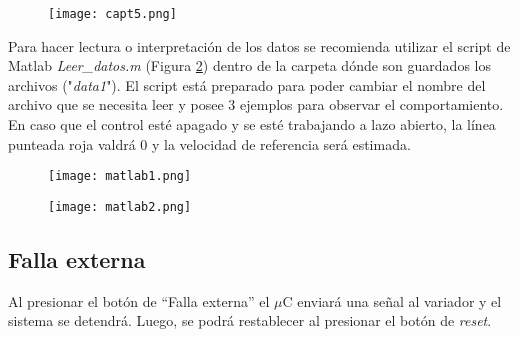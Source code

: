 \begin{figure}[H]
	\centering
	\texttt{[image: capt5.png]}
	\label{fig:capt5}
\end{figure}
Para hacer lectura o interpretación de los datos se recomienda utilizar el script de Matlab \textit{Leer\_datos.m} (Figura \ref{fig:matlab1}) dentro de la carpeta dónde son guardados los archivos ("\textit{data1}"). El script está preparado para poder cambiar el nombre del archivo que se necesita leer y posee 3 ejemplos para observar el comportamiento.\\ En caso que el control esté apagado y se esté trabajando a lazo abierto, la línea punteada roja valdrá 0 y la velocidad de referencia será estimada.

\begin{figure}[H]
	\centering
	\texttt{[image: matlab1.png]}
	\label{fig:matlab1}
\end{figure}

\begin{figure}[H]
	\centering
	\texttt{[image: matlab2.png]}
	\label{fig:matlab2}
\end{figure}

\subsection{Falla externa}
	Al presionar el botón de “Falla externa” el $\mu$C enviará una señal al variador y el sistema se detendrá. Luego, se podrá restablecer al presionar el botón de \textit{reset}.

\newpage





